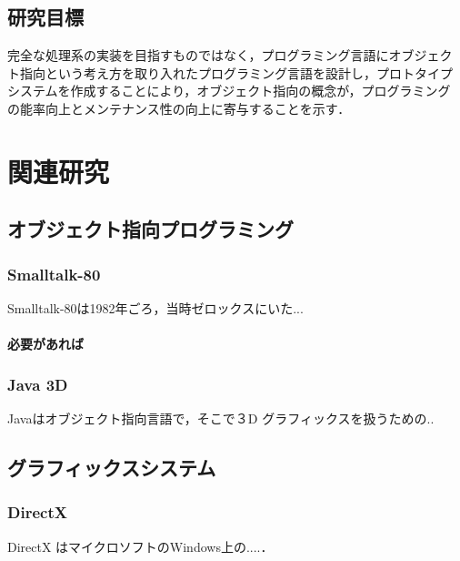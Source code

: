 \documentclass{funthesis}
\begin{document}
\section{研究目標}

完全な処理系の実装を目指すものではなく，プログラミング言語にオブジェク
ト指向という考え方を取り入れたプログラミング言語を設計し，プロトタイプ
システムを作成することにより，オブジェクト指向の概念が，プログラミング
の能率向上とメンテナンス性の向上に寄与することを示す．

\chapter{関連研究}

\section{オブジェクト指向プログラミング}

\subsection{Smalltalk-80} %

Smalltalk-80は1982年ごろ，当時ゼロックスにいた...

\subsubsection{必要があれば} %

\subsection{Java 3D}

Javaはオブジェクト指向言語で，そこで３D グラフィックスを扱うための..

\section{グラフィックスシステム}

\subsection{DirectX}

DirectX はマイクロソフトのWindows上の....．


\end{document}
